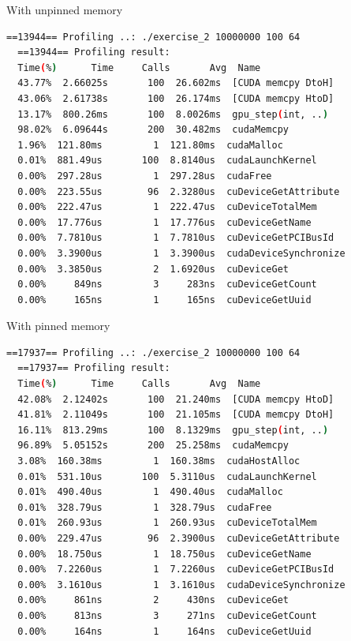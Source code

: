 \documentclass{article}
\begin{document}
With unpinned memory 

\begin{mdframed}[backgroundcolor=codeColor,leftmargin=0.0cm,hidealllines=true,%
  innerleftmargin=0.1cm,innerrightmargin=0.1cm,innertopmargin=0.5cm,innerbottommargin=0.10cm,
  roundcorner=15pt]
  \begin{lstlisting}[language=bash]
  ==13944== Profiling ..: ./exercise_2 10000000 100 64
  ==13944== Profiling result:
  Time(%)      Time     Calls       Avg  Name
  43.77%  2.66025s       100  26.602ms  [CUDA memcpy DtoH]
  43.06%  2.61738s       100  26.174ms  [CUDA memcpy HtoD]
  13.17%  800.26ms       100  8.0026ms  gpu_step(int, ..)
  98.02%  6.09644s       200  30.482ms  cudaMemcpy
  1.96%  121.80ms         1  121.80ms  cudaMalloc
  0.01%  881.49us       100  8.8140us  cudaLaunchKernel
  0.00%  297.28us         1  297.28us  cudaFree
  0.00%  223.55us        96  2.3280us  cuDeviceGetAttribute
  0.00%  222.47us         1  222.47us  cuDeviceTotalMem
  0.00%  17.776us         1  17.776us  cuDeviceGetName
  0.00%  7.7810us         1  7.7810us  cuDeviceGetPCIBusId
  0.00%  3.3900us         1  3.3900us  cudaDeviceSynchronize
  0.00%  3.3850us         2  1.6920us  cuDeviceGet
  0.00%     849ns         3     283ns  cuDeviceGetCount
  0.00%     165ns         1     165ns  cuDeviceGetUuid
  \end{lstlisting}
\end{mdframed}

\newpage 

With pinned memory
\begin{mdframed}[backgroundcolor=codeColor,leftmargin=0.0cm,hidealllines=true,%
  innerleftmargin=0.1cm,innerrightmargin=0.1cm,innertopmargin=0.5cm,innerbottommargin=0.10cm,
  roundcorner=15pt]
  \begin{lstlisting}[language=bash]
  ==17937== Profiling ..: ./exercise_2 10000000 100 64
  ==17937== Profiling result:
  Time(%)      Time     Calls       Avg  Name
  42.08%  2.12402s       100  21.240ms  [CUDA memcpy HtoD]
  41.81%  2.11049s       100  21.105ms  [CUDA memcpy DtoH]
  16.11%  813.29ms       100  8.1329ms  gpu_step(int, ..)
  96.89%  5.05152s       200  25.258ms  cudaMemcpy
  3.08%  160.38ms         1  160.38ms  cudaHostAlloc
  0.01%  531.10us       100  5.3110us  cudaLaunchKernel
  0.01%  490.40us         1  490.40us  cudaMalloc
  0.01%  328.79us         1  328.79us  cudaFree
  0.01%  260.93us         1  260.93us  cuDeviceTotalMem
  0.00%  229.47us        96  2.3900us  cuDeviceGetAttribute
  0.00%  18.750us         1  18.750us  cuDeviceGetName
  0.00%  7.2260us         1  7.2260us  cuDeviceGetPCIBusId
  0.00%  3.1610us         1  3.1610us  cudaDeviceSynchronize
  0.00%     861ns         2     430ns  cuDeviceGet
  0.00%     813ns         3     271ns  cuDeviceGetCount
  0.00%     164ns         1     164ns  cuDeviceGetUuid
  \end{lstlisting}
\end{mdframed}
\end{document}
